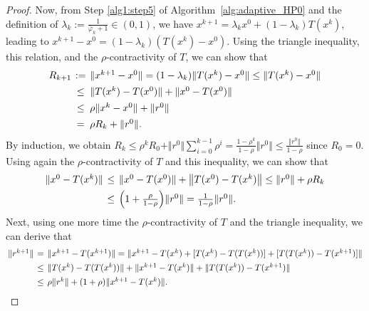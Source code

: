 \documentclass{article}
\theoremstyle{plain}
\theoremstyle{definition}
\newcommand{\norm}[1]{\left\Vert#1\right\Vert}
\newcommand{\norms}[1]{\Vert#1\Vert}
\newcommand{\0}{\boldsymbol{0}}
\begin{document}
\begin{proof}
Now, from Step \ref{alg1:step5} of Algorithm~\ref{alg:adaptive_HP0} and the definition of $\lambda_k := \frac{1}{\bar{\varphi}_k + 1} \in (0, 1)$, we have $x^{k+1} = \lambda_kx^0 + (1-\lambda_k)T(x^k)$, leading to $x^{k+1} - x^0 = (1-\lambda_k)(T(x^k) - x^0)$.
Using the triangle inequality, this relation, and the $\rho$-contractivity of $T$, we can show that
\begin{equation*}
\arraycolsep=0.2em
\begin{array}{lcl}
R_{k+1} &:= & \norms{x^{k+1} - x^0} = (1-\lambda_k)\norms{T(x^k) - x^0} \leq \norms{T(x^k) - x^0} \vspace{1ex}\\
& \leq & \norms{T(x^k) - T(x^0)} + \norms{x^0 - T(x^0)} \vspace{1ex}\\
& \leq & \rho\norms{x^k - x^0} + \norms{r^0} \vspace{1ex}\\
& = & \rho R_k + \norms{r^0}.
\end{array}
\end{equation*}
By induction, we obtain $R_k \leq \rho^k R_0 + \norms{r^0}\sum_{i=0}^{k-1}\rho^i = \frac{1-\rho^k}{1-\rho}\norms{r^0} \leq \frac{\norms{r^0}}{1-\rho}$  since $R_0 = 0$.
Using again the $\rho$-contractivity of $T$ and this inequality, we can show that
\begin{equation}\label{eq:th21_proof1}
\arraycolsep=0.2em
\begin{array}{lcl}
\norms{x^0 - T(x^k)} & \leq & \norms{x^0 - T(x^0)} + \norm{T(x^0) - T(x^k)} \leq \norms{r^0} + \rho R_k \vspace{1ex}\\
& \leq & \Big(1 + \frac{\rho}{1-\rho}\Big)\norms{r^0} = \frac{1}{1-\rho}\norms{r^0}.
\end{array}
\end{equation}
Next, using one more time the $\rho$-contractivity of $T$ and the triangle inequality, we can derive that
\begin{equation}\label{eq:th21_proof2} 
\arraycolsep=0.2em
\begin{array}{lcl}
\norms{r^{k+1}} & = & \norms{x^{k+1} - T(x^{k+1})} = \norms{x^{k+1} - T(x^k) + [T(x^k) - T(T(x^k))] + [T(T(x^k)) - T(x^{k+1})]} \vspace{1ex}\\
& \leq & \norms{T(x^k) - T(T(x^k))} + \norms{x^{k+1} - T(x^k)} +  \norms{T(T(x^k)) - T(x^{k+1})} \vspace{1ex}\\
& \leq & \rho\norms{r^k} +  (1 + \rho)\norms{x^{k+1} - T(x^k)}.

\end{array}
\end{equation}
\end{proof}
\end{document}
